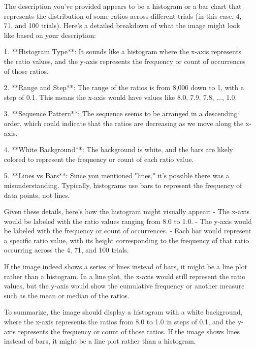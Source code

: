 The description you've provided appears to be a histogram or a bar chart that represents the distribution of some ratios across different trials (in this case, 4, 71, and 100 trials). Here's a detailed breakdown of what the image might look like based on your description:

1. **Histogram Type**: It sounds like a histogram where the x-axis represents the ratio values, and the y-axis represents the frequency or count of occurrences of those ratios.

2. **Range and Step**: The range of the ratios is from 8,000 down to 1, with a step of 0.1. This means the x-axis would have values like 8.0, 7.9, 7.8, ..., 1.0.

3. **Sequence Pattern**: The sequence seems to be arranged in a descending order, which could indicate that the ratios are decreasing as we move along the x-axis.

4. **White Background**: The background is white, and the bars are likely colored to represent the frequency or count of each ratio value.

5. **Lines vs Bars**: Since you mentioned "lines," it's possible there was a misunderstanding. Typically, histograms use bars to represent the frequency of data points, not lines.

Given these details, here’s how the histogram might visually appear:
- The x-axis would be labeled with the ratio values ranging from 8.0 to 1.0.
- The y-axis would be labeled with the frequency or count of occurrences.
- Each bar would represent a specific ratio value, with its height corresponding to the frequency of that ratio occurring across the 4, 71, and 100 trials.

If the image indeed shows a series of lines instead of bars, it might be a line plot rather than a histogram. In a line plot, the x-axis would still represent the ratio values, but the y-axis would show the cumulative frequency or another measure such as the mean or median of the ratios.

To summarize, the image should display a histogram with a white background, where the x-axis represents the ratios from 8.0 to 1.0 in steps of 0.1, and the y-axis represents the frequency or count of those ratios. If the image shows lines instead of bars, it might be a line plot rather than a histogram.